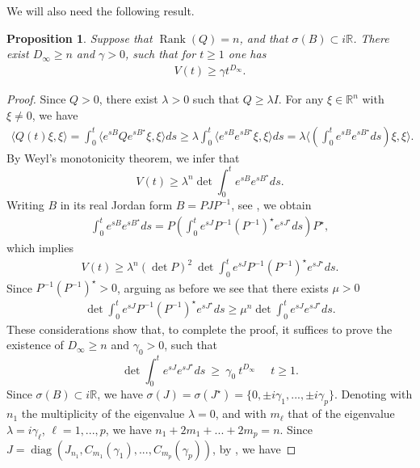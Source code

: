 \documentclass[11pt,letter]{amsart}
\newcommand{\Rn}{\mathbb R^n}
\newcommand{\la}{\lambda}
\numberwithin{equation}{section}
\newcommand{\sa}{\langle}
\newcommand{\da}{\rangle}
\newtheorem{proposition}[theorem]{Proposition}
\numberwithin{equation}{section}
\begin{document}
We will also need the following result.




\begin{proposition}\label{P:ii}
Suppose that $\operatorname{Rank}(Q) = n$, and that $\sigma(B)\subset i \mathbb{R}$. There exist $D_{\infty}\ge n$ and $\gamma>0$, such that for $t\ge 1$ one has
\begin{align*}
V(t)\ge \gamma t^{D_{\infty}}.
\end{align*}
\end{proposition}

\begin{proof}
Since $Q>0$, there exist $\lambda>0$ such that $Q\ge \lambda I$. For any $\xi \in \Rn$ with $\xi\not= 0$, we have
\begin{align*}
\sa Q(t)\xi,\xi\da =\int_{0}^{t}\sa e^{sB}Qe^{sB^{\star}}\xi,\xi\da ds \ge \lambda \int_{0}^{t}\sa e^{sB}e^{sB^{\star}}\xi,\xi\da ds=\lambda \sa\left(\int_{0}^{t}e^{sB}e^{sB^{\star}} ds\right) \xi,\xi\da.
\end{align*}
By Weyl's monotonicity theorem, we infer that
\[
V(t) \ge \la^n \det \int_{0}^{t}e^{sB}e^{sB^{\star}} ds.
\]
Writing $B$ in its real Jordan form $B=PJP^{-1}$, see \cite[Theor.3.4.5]{HJ}, we obtain
\begin{align*}
\int_{0}^{t}e^{sB}e^{sB^{\star}}ds=P\left(\int_{0}^{t}e^{sJ}P^{-1}(P^{-1})^{\star}e^{sJ^{\star}}ds\right)P^{\star},
\end{align*}
which implies
\begin{align*}
V(t)\ge \la^n (\det P)^{2}\ \det \int_{0}^{t}e^{sJ}P^{-1}(P^{-1})^{\star}e^{sJ^{\star}}ds.
\end{align*}
Since $P^{-1}(P^{-1})^{\star}> 0$, arguing as before we see that there exists $\mu>0$ 
\begin{align*}
\det \int_{0}^{t}e^{sJ}P^{-1}(P^{-1})^{\star}e^{sJ^{\star}}ds\ge \mu^n \det \int_{0}^{t}e^{sJ}e^{sJ^{\star}}ds.
\end{align*}
These considerations show that, to complete the proof, it suffices to prove the existence of $D_\infty\ge n$ and $\gamma_0>0$, such that
\begin{equation}\label{hofm}
\det \int_{0}^{t}e^{sJ}e^{sJ^{\star}}ds\ \ge\ \gamma_0\ t^{D_\infty}\ \ \ \ \ \ t\ge 1.
\end{equation}
Since $\sigma(B)\subset i \mathbb{R}$, we have $\sigma(J)=\sigma(J^{\star})=\{0,\pm i\gamma_{1},...,\pm i\gamma_{p}\}$. Denoting with $n_1$ the multiplicity of the eigenvalue $\la = 0$, and with $m_\ell$ that of the eigenvalue $\la = i \gamma_\ell$, $\ell=1,...,p$, we have $n_{1}+2m_{1}+...+2m_{p}=n$. Since $J = \operatorname{diag}(J_{n_{1}},C_{m_1}(\gamma_1),...,C_{m_{p}}(\gamma_{p}))$, by \cite[Prop.11.2.8,(vi)]{Bernie}, we have 

\end{proof}
\end{document}
